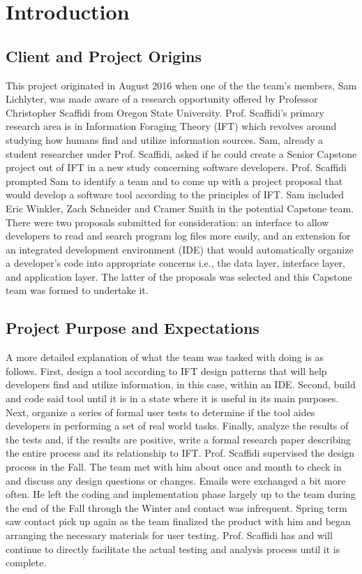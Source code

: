 \documentclass[letterpaper,10pt,titlepage,draftclsnofoot,onecolumn,onesided] {IEEEtran}
\begin{document}

\tableofcontents


\pagebreak

\section{Introduction}
\subsection{Client and Project Origins}
This project originated in August 2016 when one of the the team's members, Sam Lichlyter, was made aware of a research opportunity offered by Professor Christopher Scaffidi from Oregon State University. 
Prof. Scaffidi's primary research area is in Information Foraging Theory (IFT) which revolves around studying how humans find and utilize information sources. 
Sam, already a student researcher under Prof. Scaffidi, asked if he could create a Senior Capstone project out of IFT in a new study concerning software developers.
Prof. Scaffidi prompted Sam to identify a team and to come up with a project proposal that would develop a software tool according to the principles of IFT. 
Sam included Eric Winkler, Zach Schneider and Cramer Smith in the potential Capstone team. 
There were two proposals submitted for consideration: an interface to allow developers to read and search program log files more easily, and an extension for an integrated development environment (IDE) that would automatically organize a developer's code into appropriate concerns i.e., the data layer, interface layer, and application layer.
The latter of the proposals was selected and this Capstone team was formed to undertake it.

\subsection{Project Purpose and Expectations}
A more detailed explanation of what the team was tasked with doing is as follows.
First, design a tool according to IFT design patterns that will help developers find and utilize information, in this case, within an IDE.
Second, build and code said tool until it is in a state where it is useful in its main purposes.
Next, organize a series of formal user tests to determine if the tool aides developers in performing a set of real world tasks.
Finally, analyze the results of the tests and, if the results are positive, write a formal research paper describing the entire process and its relationship to IFT.
Prof. Scaffidi supervised the design process in the Fall. The team met with him about once and month to check in and discuss any design questions or changes. 
Emails were exchanged a bit more often. 
He left the coding and implementation phase largely up to the team during the end of the Fall through the Winter and contact was infrequent. 
Spring term saw contact pick up again as the team finalized the product with him and began arranging the necessary materials for user testing. 
Prof. Scaffidi has and will continue to directly facilitate the actual testing and analysis process until it is complete.
\end{document}
